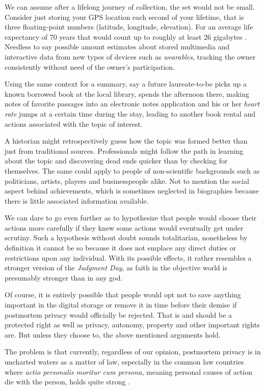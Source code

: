 We can assume after a lifelong journey of collection, the set would not be small. Consider just storing your GPS location each second of your  lifetime, that is three floating-point numbers (latitude, longitude, elevation).
For an average life expectancy of 70 years that would count up to roughly at least 26 gigabytes \cite{calc}. Needless to say possible amount estimates about stored multimedia and interactive data from new types of devices such as \emph{wearables}, tracking the owner consistently without need of the owner's participation.

Using the same context for a summary, say a future laureate-to-be picks up a known borrowed book at the local library, spends the afternoon there, making notes of favorite passages into an electronic notes application and his or her \emph{heart rate} jumps at a certain time during the stay, leading to another book rental and actions associated with the topic of interest.

A historian might retrospectively guess how the topic was formed better than just from traditional sources. Professionals might follow the path in learning about the topic and discovering dead ends quicker than by checking for themselves.
The same could apply to people of non-scientific backgrounds such as politicians, artists, players and businesspeople alike. Not to mention the social aspect behind achievements, which is sometimes neglected in biographies because there is little associated information available.

We can dare to go even further as to hypothesize that people would choose their actions more carefully if they knew some actions would eventually get under scrutiny. Such a hypothesis without doubt sounds totalitarian, nonetheless by definition it cannot be so because it does not emplace any direct duties or restrictions upon any individual. With its possible effects, it rather resembles a stronger version of the \textit{Judgment Day}, as faith in the objective world is presumably stronger than in any god.

Of course, it is entirely possible that people would opt not to save anything important in the digital storage or remove it in time before their demise if postmortem privacy would officially be rejected. That is and should be a protected right as well as privacy, autonomy, property and other important rights are. But unless they choose to, the above mentioned arguments hold.

The problem is that currently, regardless of our opinion, postmortem privacy is in uncharted waters as a matter of law, especially in the common law countries where \textit{actio personalis moritur cum persona}, meaning personal causes of action die with the person, holds quite strong \cite{harbinja2}.

